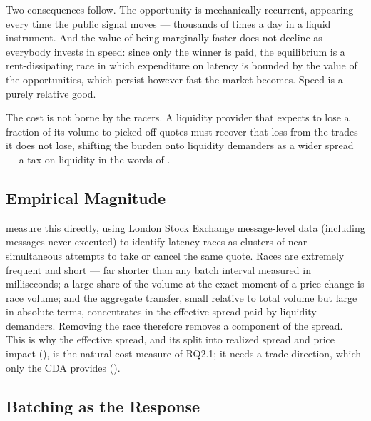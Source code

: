 Two consequences follow. The opportunity is mechanically recurrent,
appearing every time the public signal moves --- thousands of times a day
in a liquid instrument. And the value of being marginally faster does not
decline as everybody invests in speed: since only the winner is paid, the
equilibrium is a rent-dissipating race in which expenditure on latency is
bounded by the value of the opportunities, which persist however fast the
market becomes. Speed is a purely relative good.

The cost is not borne by the racers. A liquidity provider that expects to
lose a fraction of its volume to picked-off quotes must recover that loss
from the trades it does not lose, shifting the burden onto liquidity
demanders as a wider spread --- a tax on liquidity in the words of
\citet{budish2015hft}.

\subsection{Empirical Magnitude}

\citet{aquilina2022quantifying} measure this directly, using London Stock
Exchange message-level data (including messages never executed) to
identify latency races as clusters of near-simultaneous attempts to take
or cancel the same quote. Races are extremely frequent and short --- far
shorter than any batch interval measured in milliseconds; a large share of
the volume at the exact moment of a price change is race volume; and the
aggregate transfer, small relative to total volume but large in absolute
terms, concentrates in the effective spread paid by liquidity demanders.
Removing the race therefore removes a component of the spread. This is why
the effective spread, and its split into realized spread and price impact
(), is the natural cost measure of RQ2.1; it needs a
trade direction, which only the CDA provides ().

\subsection{Batching as the Response}


